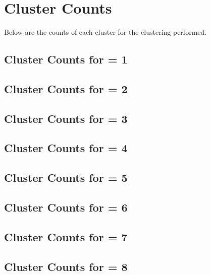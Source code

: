 \chapter{Cluster Counts}
Below are the \spec{} counts of each cluster for the clustering performed.

\let\svaddcontentsline\addcontentsline
\renewcommand\addcontentsline[3]{%
  \ifthenelse{\equal{#1}{lof}}{}%
  {\ifthenelse{\equal{#1}{lot}}{}{\svaddcontentsline{#1}{#2}{#3}}}}

\section{Cluster Counts for \minneigh{} = 1}

\clearpage

\section{Cluster Counts for \minneigh{} = 2}

\clearpage

\section{Cluster Counts for \minneigh{} = 3}

\clearpage

\section{Cluster Counts for \minneigh{} = 4}

\clearpage

\section{Cluster Counts for \minneigh{} = 5}

\clearpage

\section{Cluster Counts for \minneigh{} = 6}

\clearpage

\section{Cluster Counts for \minneigh{} = 7}

\clearpage

\section{Cluster Counts for \minneigh{} = 8}

\clearpage